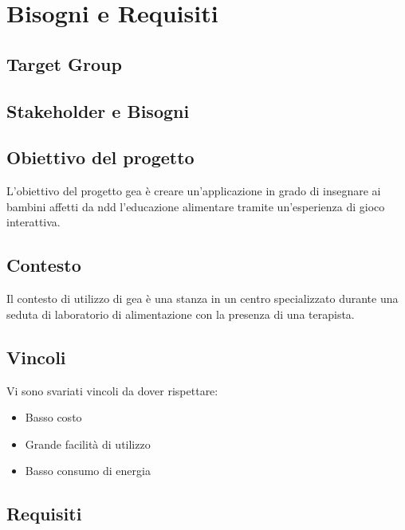 \section{Bisogni e Requisiti} \label{sec:biso}

\subsection{Target Group} \label{subsec:target}


\subsection{Stakeholder e Bisogni} \label{subsec:stakbis}


\subsection{Obiettivo del progetto} \label{subsec:obiettivo}
L'obiettivo del progetto \acs{gea} è creare un'applicazione in grado di insegnare ai bambini affetti da \acs{ndd} l'educazione alimentare tramite un'esperienza di gioco interattiva.


\subsection{Contesto} \label{subsec:contesto}
Il contesto di utilizzo di \acs{gea} è una stanza in un centro specializzato durante una seduta di laboratorio di alimentazione con la presenza di una terapista.


\subsection{Vincoli} \label{subsec:vincoli}
Vi sono svariati vincoli da dover rispettare:
\begin{itemize}
\item Basso costo
\item Grande facilità di utilizzo
\item Basso consumo di energia
\end{itemize}


\subsection{Requisiti} \label{subsec:requis}